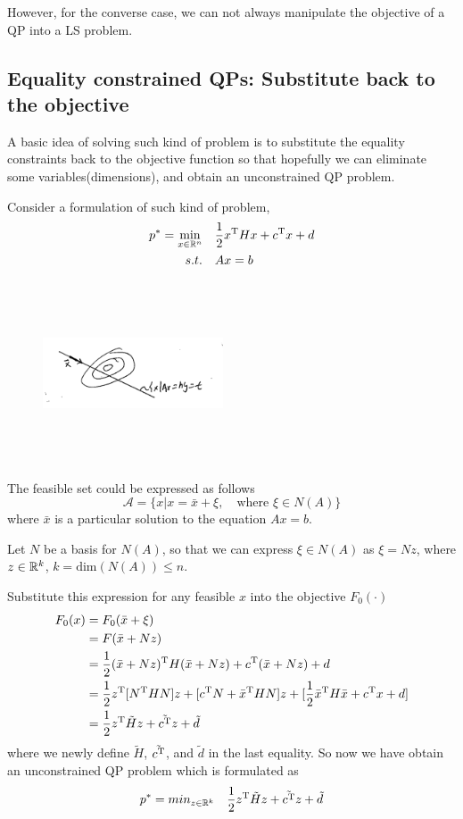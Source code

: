 However, for the converse case, we can not always manipulate the objective of a QP into a  LS problem.


\subsection{Equality constrained QPs: Substitute back to the objective}
A basic idea of solving such kind of problem is to substitute the equality constraints back to the objective function so that hopefully we can eliminate some variables(dimensions), and obtain an unconstrained QP problem.

Consider a formulation of such kind of problem,
\begin{align*}
p^* = \min_{x\in \mathbb{R}^n}\quad &\frac{1}{2}x^{{\rm T}}Hx + c^{{\rm T}}x + d\\
s.t.\quad &Ax = b
\end{align*}


\begin{figure}
	\centering
	\includegraphics[width=2.1in,height=2.1in]{figures/ch07/figure1016_b.png}
\end{figure}

The feasible set could be expressed as follows
$$\mathcal{A} =\{x | x = \bar{x} + \xi,\quad \text{where } \xi \in N(A) \}$$
where $\bar{x}$ is a particular solution to the equation $Ax=b$.

Let $N$ be a basis for $N(A)$, so that we can express $\xi \in N(A)$ as $\xi = Nz$, where $z\in \mathbb{R}^k$, $k =\text{dim}(N(A)) \leq n$.

Substitute this expression for any feasible $x$ into the objective $F_0(\cdot)$
\begin{align*}
F_0(x) 
&= F_0(\bar{x} + \xi)\\
&= F(\bar{x} + Nz)\\
&= \frac{1}{2}(\bar{x} + Nz)^{{\rm T}}H(\bar{x}+Nz) + c^{{\rm T}}(\bar{x} + Nz) + d\\
&= \frac{1}{2}z^{{\rm T}}[N^{{\rm T}}HN]z + [c^{{\rm T}}N + \bar{x}^{{\rm T}}HN]z + [\frac{1}{2}\bar{x}^{{\rm T}}H\bar{x} + c^{{\rm T}}x + d] \\
&= \frac{1}{2}z^{{\rm T}}\tilde{H}z + \tilde{c^{{\rm T}}}z + \tilde{d}\\
\end{align*}
where we newly define $\tilde{H}$, $\tilde{c^{{\rm T}}}$, and $\tilde{d}$ in the last equality. So now we have obtain an unconstrained QP problem which is formulated as
\begin{equation*}
p^* = min_{z\in \mathbb{R}^k}\quad \frac{1}{2}z^{{\rm T}}\tilde{H}z + \tilde{c^{{\rm T}}}z + \tilde{d}
\end{equation*}

